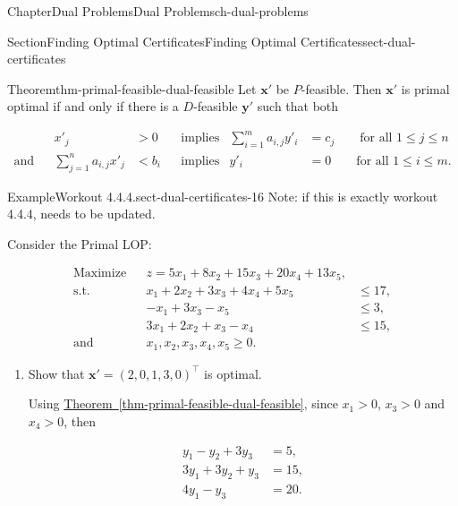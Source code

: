 \documentclass[oneside,10pt,]{book}
\newcommand{\xreffont}{\relax}
\numberwithin{equation}{section}
\newcommand{\amp}{&}
\begin{document}
\begin{chapterptx}{Chapter}{Dual Problems}{}{Dual Problems}{}{}{ch-dual-problems}
\begin{sectionptx}{Section}{Finding Optimal Certificates}{}{Finding Optimal Certificates}{}{}{sect-dual-certificates}
\begin{theorem}{Theorem}{}{}{thm-primal-feasible-dual-feasible}%
Let \(\boldsymbol{x}'\) be \(P\)-feasible. Then \(\boldsymbol{x}'\) is primal optimal if and only if there is a \(D\)-feasible \(\boldsymbol{y}'\) such that both%
\par
%
\begin{equation*}
\begin{aligned} \amp  \amp x'_{j} \amp  > 0 \amp  \amp \text{implies} \amp \sum_{i=1}^{m} a_{i,j}y'_{i} \amp = c_{j} \qquad \text{for all $1 \leq j \leq n$}\\ \text{and} \amp  \amp \sum_{j=1}^{n} a_{i,j}x'_{j} \amp < b_{i} \amp  \amp \text{implies} \amp y'_{i} \amp = 0 \qquad \text{for all $1 \leq i \leq m$}.\end{aligned}
\end{equation*}
%
\end{theorem}
\begin{example}{Example}{Workout 4.4.4.}{sect-dual-certificates-16}%
Note: if this is exactly workout 4.4.4, needs to be updated.%
\par
Consider the Primal LOP:%
\par
%
\begin{equation*}
\begin{aligned}\text{Maximize} \amp  \amp z = 5x_{1} + 8x_{2} + 15 x_{3} + 20x_{4} + 13 x_{5}, \amp \\ \text{s.t.} \amp  \amp x_{1} + 2x_{2} + 3x_{3} + 4x_{4} + 5x_{5} \amp \leq 17, \\ \amp  \amp -x_{1} + 3x_{3} - x_{5} \amp \leq 3, \\ \amp  \amp 3x_{1} + 2x_{2} + x_{3} - x_{4} \amp \leq 15, \\ \text{and} \amp  \amp x_{1}, x_{2}, x_{3}, x_{4}, x_{5} \geq 0.\end{aligned}
\end{equation*}
%
\par
%
\begin{enumerate}
\item{}Show that \(\boldsymbol{x}'=(2,0,1,3,0)^{\intercal}\) is optimal.%
\par
Using \hyperref[thm-primal-feasible-dual-feasible]{Theorem~{\xreffont\ref{thm-primal-feasible-dual-feasible}}}, since \(x_{1} > 0\), \(x_{3} > 0\) and \(x_{4} > 0\), then%
\par
%
\begin{equation*}
\begin{aligned}y_{1}-y_{2}+3y_{3} \amp = 5, \\ 3y_{1}+3y_{2}+y_{3} \amp = 15, \\ 4y_{1} - y_{3} \amp = 20.\end{aligned}

\end{equation*}
\end{enumerate}
\end{example}
\end{sectionptx}
\end{chapterptx}
\end{document}
